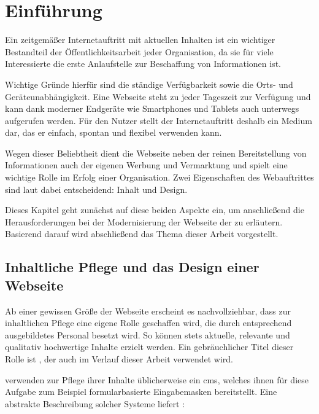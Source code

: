 \chapter{Einführung}
    \label{chapter:introduction}
    Ein zeitgemäßer Internetauftritt mit aktuellen Inhalten
    ist ein wichtiger Bestandteil der Öffentlichkeitsarbeit jeder Organisation,
    da sie für viele Interessierte die erste Anlaufstelle zur Beschaffung von Informationen ist.

    Wichtige Gründe hierfür sind die ständige Verfügbarkeit sowie die Orts-
    und Geräteunabhängigkeit.
    Eine Webseite steht zu jeder Tageszeit zur Verfügung und kann
    dank moderner Endgeräte wie Smartphones und Tablets
    auch unterwegs aufgerufen werden.
    Für den Nutzer stellt der Internetauftritt deshalb ein Medium dar,
    das er einfach, spontan und flexibel verwenden kann.

    Wegen dieser Beliebtheit dient die Webseite neben der reinen Bereitstellung von Informationen
    auch der eigenen Werbung und Vermarktung und spielt eine wichtige Rolle im Erfolg einer Organisation.
    Zwei Eigenschaften des Webauftrittes sind laut \cite{sillence:onlineHealthSites} dabei
    entscheidend: Inhalt und Design.

    Dieses Kapitel geht zunächst auf diese beiden Aspekte ein,
    um anschließend die Herausforderungen bei der Modernisierung der Webseite der {\fernUni} zu erläutern.
    Basierend darauf wird abschließend das Thema dieser Arbeit vorgestellt.
    
    \section{Inhaltliche Pflege und das Design einer Webseite}
        \label{section:ContentManagementAndDesign}
        Ab einer gewissen Größe der Webseite erscheint es nachvollziehbar,
        dass zur inhaltlichen Pflege eine eigene Rolle geschaffen wird,
        die durch entsprechend ausgebildetes Personal besetzt wird.
        So können stets aktuelle, relevante und qualitativ hochwertige Inhalte erzielt werden.
        Ein gebräuchlicher Titel dieser Rolle ist \textit{\editor},
        der auch im Verlauf dieser Arbeit verwendet wird.

        {\editors} verwenden zur Pflege ihrer Inhalte üblicherweise ein \gls{cms},
        welches ihnen für diese Aufgabe zum Beispiel formularbasierte Eingabemasken bereitstellt.
        Eine abstrakte Beschreibung solcher Systeme liefert \cite[][Seite 5,6]{barker:webCMS}:

